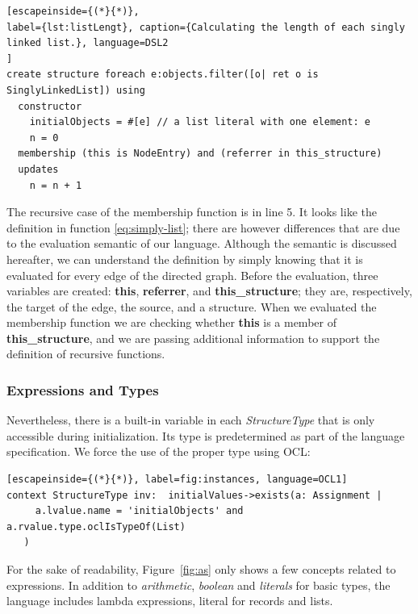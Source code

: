 \begin{lstlisting}[escapeinside={(*}{*)}, 
label={lst:listLengt}, caption={Calculating the length of each singly linked list.}, language=DSL2
]
create structure foreach e:objects.filter([o| ret o is SinglyLinkedList]) using
  constructor
    initialObjects = #[e] // a list literal with one element: e
    n = 0
  membership (this is NodeEntry) and (referrer in this_structure)
  updates 
    n = n + 1
\end{lstlisting}

The recursive case of the membership function is in line 5.
It looks like the definition in function \ref{eq:simply-list}; there are however differences that are due to the evaluation semantic of our language.
Although the semantic is discussed hereafter, we can understand the definition by simply knowing that it is evaluated for every edge of the directed graph.
Before the evaluation, three variables are created: \textbf{this}, \textbf{referrer}, and \textbf{this\_structure}; they are, respectively, the target of the edge, the source, and a structure.
When we evaluated the membership function we are checking whether \textbf{this} is a member of \textbf{this\_structure}, and we are passing additional information to support the definition of recursive functions.



\subsubsection*{Expressions and Types}


Nevertheless, there is a built-in variable in each \textit{StructureType} that is only accessible during initialization.
Its type is predetermined as part of the language specification.
We force the use of the proper type using OCL:

\begin{lstlisting}[escapeinside={(*}{*)}, label=fig:instances, language=OCL1]
context StructureType inv:  initialValues->exists(a: Assignment | 
     a.lvalue.name = 'initialObjects' and a.rvalue.type.oclIsTypeOf(List)
   ) 
\end{lstlisting}


For the sake of readability, Figure~\ref{fig:as} only shows a few concepts related to expressions.
In addition to \textit{arithmetic}, \textit{boolean} and \textit{literals} for basic types, the language includes lambda expressions, literal for records and lists.

